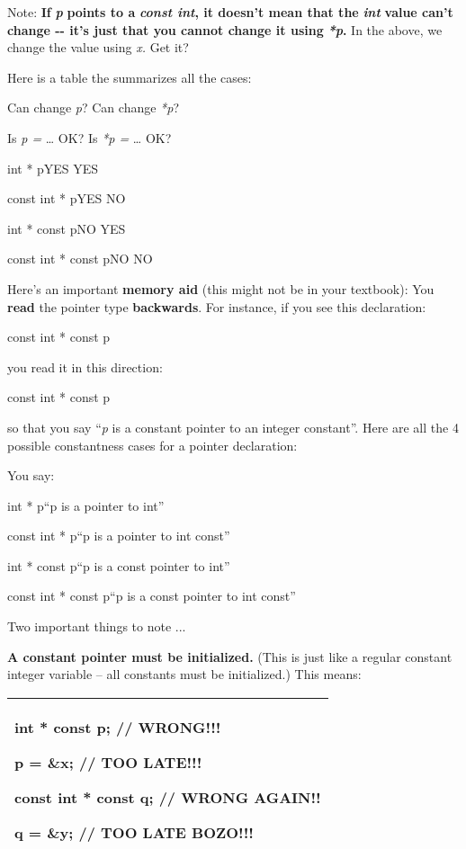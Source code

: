 \documentclass[
]{article}
\begin{document}
Note: \textbf{If }\emph{\textbf{p}}\textbf{ points to a
}\emph{\textbf{const int}}\textbf{, it doesn't mean that the
}\emph{\textbf{int }}\textbf{value can't change -\/- it's just that you
cannot change it using }\emph{\textbf{*p}}\textbf{.} In the above, we
change the value using \emph{x. }Get it?

Here is a table the summarizes all the cases:

Can change \emph{p}? Can change \emph{*p}?

Is \emph{p =} \ldots{} OK? Is \emph{*p =} \ldots{} OK?

int * pYES YES

const int * pYES NO

int * const pNO YES

const int * const pNO NO

Here's an important \textbf{memory aid} (this might not be in your
textbook): You \textbf{read} the pointer type \textbf{backwards}. For
instance, if you see this declaration:

const int * const p

you read it in this direction:

const int * const p

so that you say ``\emph{p} is a constant pointer to an integer
constant''. Here are all the 4 possible constantness cases for a pointer
declaration:

You say:

int * p``p is a pointer to int''

const int * p``p is a pointer to int const''

int * const p``p is a const pointer to int''

const int * const p``p is a const pointer to int const''

Two important things to note ...

\textbf{A constant pointer must be initialized.} (This is just like a
regular constant integer variable -- all constants must be initialized.)
This means:

\begin{longtable}[]{@{}l@{}}
\toprule
\endhead
\begin{minipage}[t]{0.97\columnwidth}\raggedright
int * const p; // WRONG!!!

p = \&x; // TOO LATE!!!

const int * const q; // WRONG AGAIN!!

q = \&y; // TOO LATE BOZO!!!\strut
\end{minipage}\tabularnewline
\bottomrule
\end{longtable}
\end{document}
